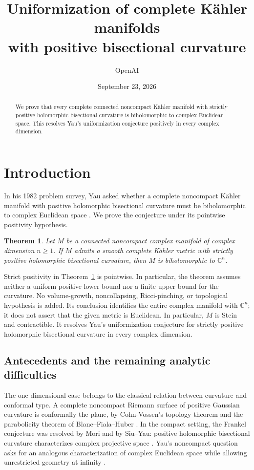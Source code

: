 \documentclass[11pt]{article}
\title{Uniformization of complete K\"ahler manifolds\protect\\
with positive bisectional curvature}
\author{OpenAI}
\date{September 23, 2026}
\newtheorem{theorem}{Theorem}[section]
\theoremstyle{definition}
\theoremstyle{remark}
\newcommand{\C}{\mathbb C}
\numberwithin{equation}{section}
\begin{document}
\maketitle
\begin{abstract}
We prove that every complete connected noncompact K\"ahler manifold with
strictly positive holomorphic bisectional curvature is biholomorphic to
complex Euclidean space. This resolves Yau's uniformization conjecture
positively in every complex dimension.
\end{abstract}
\tableofcontents
\section{Introduction}\label{sec:introduction}

In his 1982 problem survey, Yau asked whether a complete noncompact
K\"ahler manifold with positive holomorphic bisectional curvature must
be biholomorphic to complex Euclidean space \cite[\S9(b), p.~45]{YauProblems}.
We prove the conjecture under its pointwise positivity hypothesis.

\begin{theorem}\label{thm:uniformization}
Let $M$ be a connected noncompact complex manifold of complex dimension
$n\geq1$. If $M$ admits a smooth complete K\"ahler metric with strictly
positive holomorphic bisectional curvature, then $M$ is biholomorphic
to $\C^n$.
\end{theorem}

Strict positivity in Theorem~\ref{thm:uniformization} is pointwise.
In particular, the theorem assumes neither a uniform positive lower
bound nor a finite upper bound for the curvature.  No volume-growth,
noncollapsing, Ricci-pinching, or topological hypothesis is added.
Its conclusion identifies the entire complex manifold with $\C^n$;
it does not assert that the given metric is Euclidean.
In particular, $M$ is Stein and contractible.
It resolves Yau's uniformization conjecture for strictly positive
holomorphic bisectional curvature in every complex dimension.

\subsection{Antecedents and the remaining analytic difficulties}

The one-dimensional case belongs to the classical relation between
curvature and conformal type. A complete noncompact Riemann surface
of positive Gaussian curvature is conformally the plane, by
Cohn-Vossen's topology theorem and the parabolicity theorem of
Blanc--Fiala--Huber \cite[Satz~8]{CohnVossen}\cite[Theorem~15]{Huber}.
In the compact setting, the Frankel conjecture was resolved by
Mori and by Siu--Yau: positive holomorphic bisectional curvature
characterizes complex projective space \cite{MoriAmple,SiuYauFrankel}.
Yau's noncompact question asks for an analogous characterization
of complex Euclidean space while allowing unrestricted geometry
at infinity \cite[\S9(b), p.~45]{YauProblems}.
\end{document}
